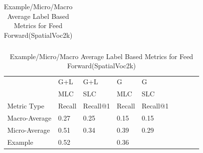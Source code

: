 \documentclass{IEEEtran}
\begin{document}
\begin{table}[!htbp]
\begin{tabular}{|l|l|l|l|l|l|l|l|l|l}
\end{tabular}
\caption{VGG16 and SmallVGG(SpatialVoc2k) results for MLC and SLC}
\centering
\begin{tabular}{|l|l|l|l|l|llll}
\cline{1-5}
	   		  &  G+L    & G+L       &  G        & G  		\\ \cline{1-5}
       		  &  MLC  	& SLC       &  MLC      & SLC       \\ \cline{1-5}
Metric Type   &  Recall & Recall@1  &  Recall   & Recall@1  \\ \cline{1-5}
Macro-Average &	0.27	&	0.25	&	0.15	&	0.15	\\ \cline{1-5}
Micro-Average &	0.51	&	0.34	&	0.39	&	0.29	\\ \cline{1-5}
Example       &	0.52	& 			&	0.36	&			\\ \cline{1-5}
\end{tabular}
\caption{Example/Micro/Macro Average Label Based Metrics for Feed Forward(SpatialVoc2k)}
\end{table}
\normalsize
\end{document}
